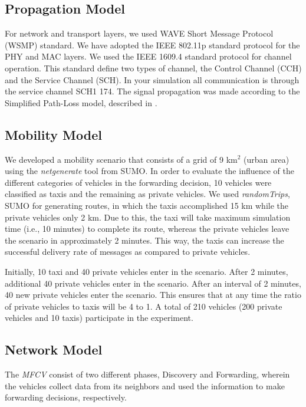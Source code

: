 \documentclass[letterpaper, 10 pt, conference]{ieeeconf}  %
\begin{document}
\subsection{Propagation Model}

For network and transport layers, we used WAVE Short Message Protocol (WSMP) standard. We have adopted the IEEE 802.11p standard protocol for the PHY and MAC layers. We used the IEEE 1609.4 standard protocol for channel operation. This standard define two types of channel, the Control Channel (CCH) and the Service Channel (SCH). In your simulation all communication is through the service channel SCH1 174. The signal propagation was made according to the Simplified Path-Loss model, described in \cite{tse2005}.

\subsection{Mobility Model}

We developed a mobility scenario that consists of a grid of 9 km$^2$ (urban area) using the \emph{netgenerate} tool from SUMO. In order to evaluate the influence of the different categories of vehicles in the forwarding decision, 10 vehicles were classified as taxis and the remaining as private vehicles. We used \emph{randomTrips}, SUMO for generating routes, in which the taxis accomplished 15 km while the private vehicles only 2 km. Due to this, the taxi will take maximum simulation time (i.e., 10 minutes) to complete its route, whereas the private vehicles leave the scenario in approximately 2 minutes. This way, the taxis can increase the successful delivery rate of messages as compared to private vehicles.

Initially, 10 taxi and 40 private vehicles enter in the scenario. After 2 minutes, additional 40 private vehicles enter in the scenario. After an interval of 2 minutes, 40 new private vehicles enter the scenario. This ensures that at any time the ratio of private vehicles to taxis will be 4 to 1. A total of 210 vehicles (200 private vehicles and 10 taxis) participate in the experiment.

\subsection{Network Model}

The \emph{MFCV} consist of two different phases, Discovery and Forwarding, wherein the vehicles collect data from its neighbors and used the information to make forwarding decisions, respectively.
\end{document}
